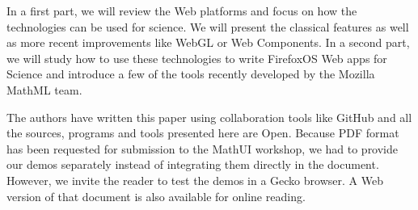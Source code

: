 In a first part, we will review the Web platforms and focus on how the
technologies can be used for science. We will present the classical features
as well as more recent improvements like WebGL or Web Components. In a second
part, we will study how to use these technologies to write FirefoxOS Web apps
for Science and introduce a few of the tools recently developed by the Mozilla
MathML team.

The authors have written this paper using collaboration tools like GitHub and
all the sources, programs and tools presented here are Open. Because PDF format
has been requested for submission to the MathUI workshop, we had to provide
our demos separately instead of integrating them directly in the document.
However, we invite the reader to test the demos in a Gecko browser. A Web
version of that document is also available for online reading.
